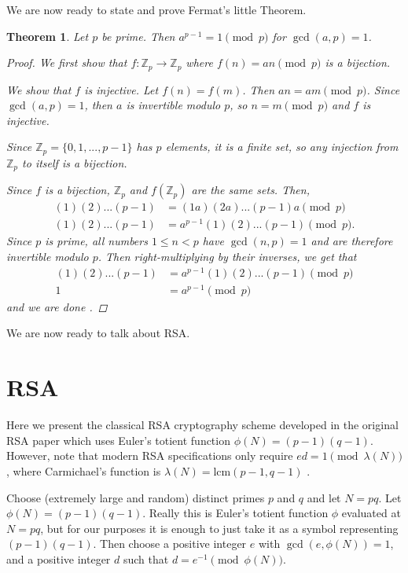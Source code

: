 \documentclass[12pt, letterpaper]{article}
\newtheorem{thm}{Theorem}[section]
\theoremstyle{definition}
\begin{document}
We are now ready to state and prove Fermat's little Theorem.

\begin{thm}
  Let $p$ be prime. Then $a^{p-1} = 1 \pmod p$ for $\gcd(a, p) = 1$.

  \begin{proof}
    We first show that $f : \mathbb{Z}_p \to \mathbb{Z}_p$ where $f(n) = a n \pmod p$
    is a bijection.

    We show that $f$ is injective. Let $f(n) = f(m)$. Then $a n = a m \pmod p$.
    Since $\gcd(a, p) = 1$, then $a$ is invertible modulo $p$, so $n = m \pmod p$
    and $f$ is injective.

    Since $\mathbb{Z}_p = \{0, 1, ..., p-1\}$ has $p$ elements, it is a finite set,
    so any injection from $\mathbb{Z}_p$ to itself is a bijection.

    Since $f$ is a bijection, $\mathbb{Z}_p$ and $f(\mathbb{Z}_p)$ are the same sets.
    Then,
    \begin{align*}
      (1)(2)...(p-1) &= (1 a) (2 a) ... (p-1) a \pmod p \\
      (1)(2)...(p-1) &= a^{p-1} (1)(2)...(p-1) \pmod p.
    \end{align*}
    Since $p$ is prime, all numbers $1 \le n < p$ have $\gcd(n, p) = 1$ and are therefore
    invertible modulo $p$. Then right-multiplying by their inverses, we get that
    \begin{align*}
      (1)(2)...(p-1) &= a^{p-1} (1)(2)...(p-1) \pmod p \\
      1 &= a^{p-1} \pmod p
    \end{align*}
    and we are done \cite{conrad_flt}.
  \end{proof}
\end{thm}

We are now ready to talk about RSA.


\section{RSA} \label{sec_rsa}
Here we present the classical RSA cryptography scheme developed in the original RSA paper
which uses Euler's totient function $\phi(N) = (p-1)(q-1)$.
However, note that modern RSA specifications only require $ed = 1 \pmod{\lambda(N)}$, where
Carmichael's function is $\lambda(N) = \text{lcm}(p-1, q-1)$ \cite{rsa}.

Choose (extremely large and random) distinct primes $p$ and $q$ and let $N = pq$.
Let $\phi(N) = (p-1)(q-1)$. Really this is Euler's totient function $\phi$ evaluated at $N = pq$,
but for our purposes it is enough to just take it as a symbol representing $(p-1)(q-1)$.
Then choose a positive integer $e$ with $\gcd(e, \phi(N)) = 1$, and a positive integer $d$
such that $d = e^{-1} \pmod{\phi(N)}$.
\end{document}
